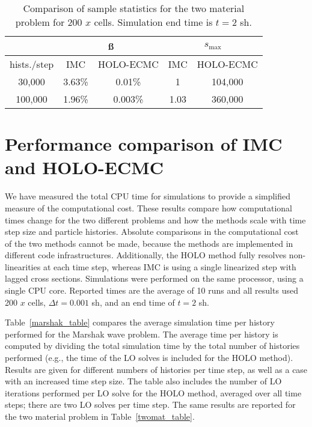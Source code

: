 \begin{table}[H]
\centering
\caption{\label{twomat_var} {Comparison of sample statistics for the
    two material problem for 200 $x$ cells.   Simulation end time is ${t=2}$ sh.}}
\vspace{-0.1in}
\begin{tabular}{|c|cc|cc|}\cline{2-5}
    \multicolumn{1}{c|}{}       & \multicolumn{2}{|c|}{\ss} & \multicolumn{2}{|c|}{$s_{\max}$} \\ \hline
hists./step     & IMC & HOLO-ECMC  &  IMC & HOLO-ECMC   \\ \hline
   30,000	    & 3.63\%  & 0.01\% &  1      &   104,000      \\
  100,000       & 1.96\%  & 0.003\% & 1.03   &   360,000      \\ \hline
\end{tabular}
\end{table}

\section{Performance comparison of IMC and HOLO-ECMC}
\label{timing}

We have measured the total CPU time for simulations to provide a simplified measure of the
computational cost.  These results compare how computational times change for the two
different problems and how the methods scale with time step size and particle histories.  Absolute comparisons in the computational cost of the two
methods cannot be made, because the methods are implemented
in different code infrastructures. Additionally, the HOLO method fully resolves
non-linearities at each time step, whereas IMC is using a single linearized step with
lagged cross sections. Simulations were performed on the same processor, using a single CPU
core.  Reported times are the average of 10 runs and all results used 200 $x$ cells,
$\Delta t = 0.001$ sh, and an end time of $t=2$ sh.

Table~\ref{marshak_table} compares the average
simulation time per history performed for the Marshak wave problem.  The average time per history is computed by dividing the total simulation time by
the total number of histories performed (e.g., the time of the LO solves is included for
the HOLO method).  Results are given for different numbers of histories per time step, as
well as a case with an increased time step size.  The table also includes the number of LO
iterations performed per LO solve for the HOLO method, averaged over all time steps;
there are two LO solves per time step.  The same results are reported for the two
material problem in Table~\ref{twomat_table}.

